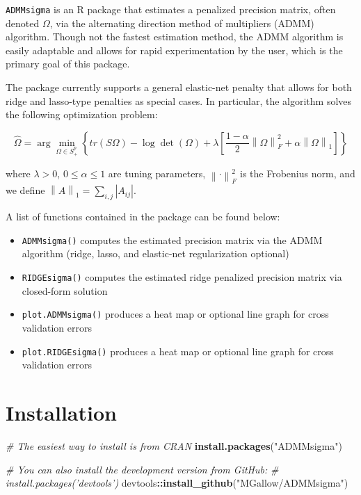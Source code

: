 \documentclass[11pt,]{report}
\newenvironment{Shaded}{\begin{snugshade}}{\end{snugshade}}
\newcommand{\CommentTok}[1]{\textcolor[rgb]{0.56,0.35,0.01}{\textit{#1}}}
\newcommand{\KeywordTok}[1]{\textcolor[rgb]{0.13,0.29,0.53}{\textbf{#1}}}
\newcommand{\NormalTok}[1]{#1}
\newcommand{\OperatorTok}[1]{\textcolor[rgb]{0.81,0.36,0.00}{\textbf{#1}}}
\newcommand{\StringTok}[1]{\textcolor[rgb]{0.31,0.60,0.02}{#1}}
\theoremstyle{definition}
\theoremstyle{definition}
\theoremstyle{definition}
\theoremstyle{remark}
\begin{document}
\texttt{ADMMsigma} is an R package that estimates a penalized precision matrix, often denoted \(\Omega\), via the alternating direction method of multipliers (ADMM) algorithm. Though not the fastest estimation method, the ADMM algorithm is easily adaptable and allows for rapid experimentation by the user, which is the primary goal of this package.

The package currently supports a general elastic-net penalty that allows for both ridge and lasso-type penalties as special cases. In particular, the algorithm solves the following optimization problem:

\[ \hat{\Omega} = \arg\min_{\Omega \in S_{+}^{p}}\left\{tr(S\Omega) - \log\det\left(\Omega\right) + \lambda\left[\frac{1 - \alpha}{2}\left\|\Omega\right\|_{F}^{2} + \alpha\left\|\Omega\right\|_{1} \right] \right\} \]

where \(\lambda > 0\), \(0 \leq \alpha \leq 1\) are tuning parameters, \(\left\|\cdot \right\|_{F}^{2}\) is the Frobenius norm, and we define \(\left\|A \right\|_{1} = \sum_{i, j} \left| A_{ij} \right|\).

A list of functions contained in the package can be found below:

\begin{itemize}
\item
  \texttt{ADMMsigma()} computes the estimated precision matrix via the ADMM algorithm (ridge, lasso, and elastic-net regularization optional)
\item
  \texttt{RIDGEsigma()} computes the estimated ridge penalized precision matrix via closed-form solution
\item
  \texttt{plot.ADMMsigma()} produces a heat map or optional line graph for cross validation errors
\item
  \texttt{plot.RIDGEsigma()} produces a heat map or optional line graph for cross validation errors
\end{itemize}

\hypertarget{installation}{%
\section{Installation}\label{installation}}

\begin{Shaded}
\begin{Highlighting}[]
\CommentTok{# The easiest way to install is from CRAN}
\KeywordTok{install.packages}\NormalTok{(}\StringTok{"ADMMsigma"}\NormalTok{)}

\CommentTok{# You can also install the development version from GitHub:}
\CommentTok{# install.packages('devtools')}
\NormalTok{devtools}\OperatorTok{::}\KeywordTok{install_github}\NormalTok{(}\StringTok{"MGallow/ADMMsigma"}\NormalTok{)}
\end{Highlighting}
\end{Shaded}
\end{document}
